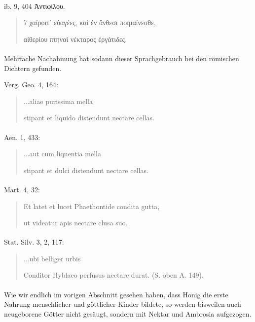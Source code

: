 \documentclass[a4paper, 11pt, oneside]{article}
\begin{document}
\paragraph{}
ib. 9, 404 Ἀντιφίλου.
\begin{quotation}\large
7 χαίροιτ᾽ εὐαγέες, καὶ ἐν ἄνθεσι ποιμαίνεσθε,

\hspace*{5mm}αἰθερίου πτηναὶ νέκταρος ἐργάτιδες.
\end{quotation}
\paragraph{}
Mehrfache Nachahmung hat sodann dieser Sprachgebrauch bei den römischen Dichtern gefunden.

Verg. Geo. 4, 164:
\begin{quotation}\large
\hspace*{5mm}...aliae purissima mella

stipant et liquido distendunt nectare cellas.
\end{quotation}
\paragraph{}
Aen. 1, 433:
\begin{quotation}\large
\hspace*{5mm}...aut cum liquentia mella

stipant et dulci distendunt nectare cellas.
\end{quotation}
\paragraph{}
Mart. 4, 32:
\begin{quotation}\large
Et latet et lucet Phaethontide condita gutta,

ut videatur apis nectare clusa suo.
\end{quotation}
\paragraph{}
Stat. Silv. 3, 2, 117:
\begin{quotation}\large
\hspace*{5mm}...ubi belliger urbis

Conditor Hyblaeo perfusus nectare durat. (S. oben A. 149).
\end{quotation}
\paragraph{}
Wie wir endlich im vorigen Abschnitt gesehen haben, dass Honig die erste Nahrung menschlicher und göttlicher Kinder bildete, so werden bisweilen auch neugeborene Götter nicht gesäugt, sondern mit Nektar und Ambrosia aufgezogen.
\end{document}
